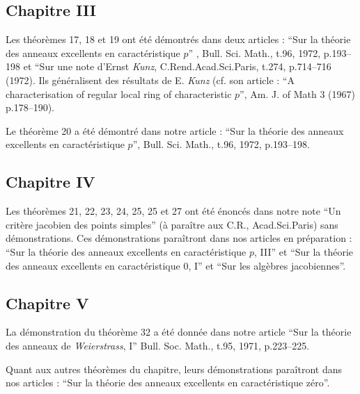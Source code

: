 \subsection*{Chapitre III}

Les théorèmes 17, 18 et 19 ont été démontrés dans deux articles : ``Sur la théorie des anneaux excellents en caractéristique $p$'' , Bull. Sci. Math., t.96, 1972, p.193--198 et ``Sur une note d’Ernst \emph{Kunz}, C.Rend.Acad.Sci.Paris, t.274, p.714--716 (1972). Ils généralisent des résultats de E. \emph{Kunz} (cf. son article : ``A characterisation of regular local ring of characteristic $p$'', Am. J. of Math 3 (1967) p.178--190).

Le théorème 20 a été démontré dans notre article : ``Sur la théorie des anneaux excellents en caractéristique $p$'', Bull. Sci. Math., t.96, 1972, p.193--198.

\subsection*{Chapitre IV}

Les théorèmes 21, 22, 23, 24, 25, 25 et 27 ont été énoncés dans notre note ``Un critère jacobien des points simples'' (à paraître aux C.R., Acad.Sci.Paris) sans démonstrations. Ces démonstrations paraîtront dans nos articles en préparation : ``Sur la théorie des anneaux excellents en caractéristique $p$, III'' et ``Sur la théorie des anneaux excellents en caractéristique $0$, I'' et ``Sur les algèbres jacobiennes''.

\subsection*{Chapitre V}

La démonstration du théorème 32 a été donnée dans notre article ``Sur la théorie des anneaux de \emph{Weierstrass}, I'' Bull. Soc. Math., t.95, 1971, p.223--225.

Quant aux autres théorèmes du chapitre, leurs démonstrations paraîtront dans nos articles : ``Sur la théorie des anneaux excellents en caractéristique zéro''.

